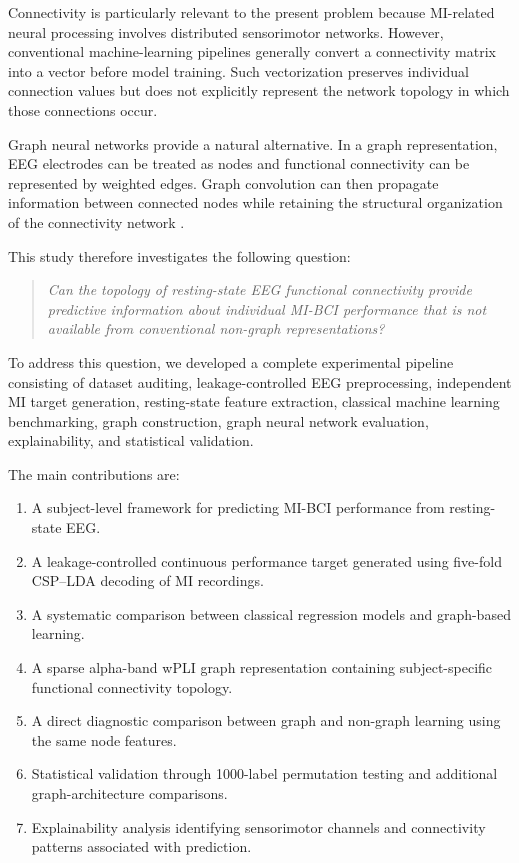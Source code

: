 \documentclass[conference]{IEEEtran}
\begin{document}
Connectivity is particularly relevant to the present problem because MI-related neural processing involves distributed sensorimotor networks. However, conventional machine-learning pipelines generally convert a connectivity matrix into a vector before model training. Such vectorization preserves individual connection values but does not explicitly represent the network topology in which those connections occur.

Graph neural networks provide a natural alternative. In a graph representation, EEG electrodes can be treated as nodes and functional connectivity can be represented by weighted edges. Graph convolution can then propagate information between connected nodes while retaining the structural organization of the connectivity network \cite{kipf2017}.

This study therefore investigates the following question:
\begin{quote}
\textit{Can the topology of resting-state EEG functional connectivity provide predictive information about individual MI-BCI performance that is not available from conventional non-graph representations?}
\end{quote}

To address this question, we developed a complete experimental pipeline consisting of dataset auditing, leakage-controlled EEG preprocessing, independent MI target generation, resting-state feature extraction, classical machine learning benchmarking, graph construction, graph neural network evaluation, explainability, and statistical validation.

The main contributions are:
\begin{enumerate}
\item A subject-level framework for predicting MI-BCI performance from resting-state EEG.
\item A leakage-controlled continuous performance target generated using five-fold CSP--LDA decoding of MI recordings.
\item A systematic comparison between classical regression models and graph-based learning.
\item A sparse alpha-band wPLI graph representation containing subject-specific functional connectivity topology.
\item A direct diagnostic comparison between graph and non-graph learning using the same node features.
\item Statistical validation through 1000-label permutation testing and additional graph-architecture comparisons.
\item Explainability analysis identifying sensorimotor channels and connectivity patterns associated with prediction.
\end{enumerate}
\end{document}
